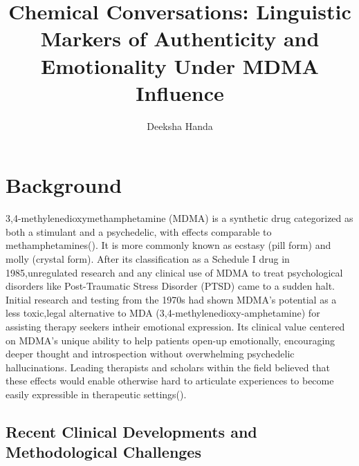\documentclass[
  man,
  longtable,
  nolmodern,
  notxfonts,
  notimes,
  colorlinks=true,linkcolor=blue,citecolor=blue,urlcolor=blue]{apa7}
\title{Chemical Conversations: Linguistic Markers of Authenticity and
Emotionality Under MDMA Influence}
\author{Deeksha Handa}
\affiliation{
{Social Sciences Department, University of Chicago}}
\begin{document}
\maketitle


\setcounter{secnumdepth}{-\maxdimen} %

\setlength\LTleft{0pt}


\section{Background}\label{background}

3,4-methylenedioxymethamphetamine (MDMA) is a synthetic drug categorized
as both a stimulant and a psychedelic, with effects comparable to
methamphetamines(). It is more commonly known as ecstasy
(pill form) and molly (crystal form). After its classification as a
Schedule I drug in 1985,unregulated research and any clinical use of
MDMA to treat psychological disorders like Post-Traumatic Stress
Disorder (PTSD) came to a sudden halt. Initial research and testing from
the 1970s had shown MDMA's potential as a less toxic,legal alternative
to MDA (3,4-methylenedioxy-amphetamine) for assisting therapy seekers
intheir emotional expression. Its clinical value centered on MDMA's
unique ability to help patients open-up emotionally, encouraging deeper
thought and introspection without overwhelming psychedelic
hallucinations. Leading therapists and scholars within the field
believed that these effects would enable otherwise hard to articulate
experiences to become easily expressible in therapeutic
settings().

\subsection{Recent Clinical Developments and Methodological
Challenges}\label{recent-clinical-developments-and-methodological-challenges}
\end{document}
